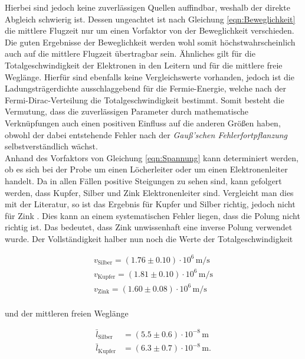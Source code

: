 \noindent Hierbei sind jedoch keine zuverlässigen Quellen auffindbar, weshalb der direkte Abgleich schwierig ist. 
Dessen ungeachtet ist nach Gleichung \eqref{eqn:Beweglichkeit} die mittlere Flugzeit nur um einen Vorfaktor von der 
Beweglichkeit verschieden. Die guten Ergebnisse der Beweglichkeit werden wohl somit höchstwahrscheinlich auch auf die 
mittlere Flugzeit übertragbar sein. Ähnliches gilt für die Totalgeschwindigkeit der Elektronen in den Leitern und für 
die mittlere freie Weglänge. Hierfür sind ebenfalls keine Vergleichswerte vorhanden, jedoch ist die Ladungsträgerdichte 
ausschlaggebend für die Fermie-Energie, welche nach der Fermi-Dirac-Verteilung die Totalgeschwindigkeit bestimmt. Somit 
besteht die Vermutung, dass die zuverlässigen Parameter durch mathematische Verknüpfungen auch einen positiven Einfluss 
auf die anderen Größen haben, obwohl der dabei entstehende Fehler nach der \emph{Gauß'schen Fehlerfortpflanzung} 
selbstverständlich wächst.\\ 
\noindent Anhand des Vorfaktors von Gleichung \eqref{eqn:Spannung} kann determiniert werden, ob es sich bei der Probe um 
einen Löcherleiter oder um einen Elektronenleiter handelt. Da in allen Fällen positive Steigungen zu sehen sind, kann gefolgert 
werden, dass Kupfer, Silber und Zink Elektronenleiter sind. Vergleicht man dies mit der Literatur, so ist das Ergebnis für 
Kupfer und Silber richtig, jedoch nicht für Zink \cite{Elektronenleiter}. Dies kann an einem systematischen Fehler liegen, 
dass die Polung nicht richtig ist. Das bedeutet, dass Zink unwissenhaft eine inverse Polung verwendet wurde.
Der Vollständigkeit halber nun noch die Werte der Totalgeschwindigkeit

\begin{align*}
    v_\text{Silber} = \left(1.76\pm0.10\right)\cdot10^{6}\,\unit{\meter\per\second}\\
    v_\text{Kupfer} = \left(1.81\pm0.10\right)\cdot10^{6}\,\unit{\meter\per\second}\\
    v_\text{Zink} = \left(1.60\pm0.08\right)\cdot10^{6}\,\unit{\meter\per\second}\\
\end{align*}

\noindent und der mittleren freien Weglänge

\begin{align*}
    \bar{l}_\text{Silber} &= \left(5.5\pm0.6\right)\cdot10^{-8}\,\unit{\meter}\\
    \bar{l}_\text{Kupfer} &= \left(6.3\pm0.7\right)\cdot10^{-8}\,\unit{\meter}.\\
\end{align*}

